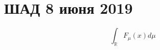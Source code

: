 \documentclass[a4paper]{article}
\author{Васильев Павел}
\begin{document}
\section*{ШАД 8 июня 2019}

\[
\int_{\mathbb{R}} F_\mu(x) d \mu
\]
\end{document}

